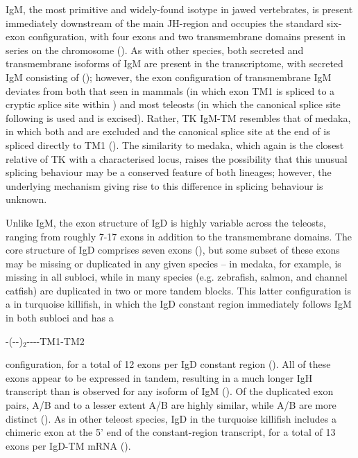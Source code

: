 	IgM, the most primitive and widely-found isotype in jawed vertebrates, is present immediately downstream of the main JH-region and occupies the standard six-exon configuration, with four \cm{} exons and two transmembrane domains present in series on the chromosome (). As with other species, both secreted and transmembrane isoforms of IgM are present in the transcriptome, with secreted IgM consisting of  (); however, the exon configuration of transmembrane IgM deviates from both that seen in mammals (in which exon TM1 is spliced to a cryptic splice site within ) and most teleosts (in which the canonical splice site following  is used and  is excised). Rather, TK IgM-TM resembles that of medaka, in which both  and  are excluded and the canonical splice site at the end of  is spliced directly to TM1 (). The similarity to medaka, which again is the closest relative of TK with a characterised locus, raises the possibility that this unusual splicing behaviour may be a conserved feature of both lineages; however, the underlying mechanism giving rise to this difference in splicing behaviour is unknown.
	
		Unlike IgM, the exon structure of IgD is highly variable across the teleosts, ranging from roughly 7-17 \cd{} exons in addition to the transmembrane domains. The core structure of IgD comprises seven \cd{} exons (), but some subset of these exons may be missing or duplicated in any given species -- in medaka, for example,  is missing in all subloci, while in many species (e.g. zebrafish, salmon, and channel catfish)  are duplicated in two or more tandem blocks. This latter configuration is a in turquoise killifish, in which the IgD constant region immediately follows IgM in both subloci and has a 

-(--)$_2$----TM1-TM2 

	\noindent configuration, for a total of 12 exons per IgD constant region (). All of these exons appear to be expressed in tandem, resulting in a much longer IgH transcript than is observed for any isoform of IgM (). Of the duplicated exon pairs, A/B and to a lesser extent A/B are highly similar, while A/B are more distinct (). As in other teleost species, IgD in the turquoise killifish includes a chimeric  exon at the 5' end of the constant-region transcript, for a total of 13 exons per IgD-TM mRNA ().

